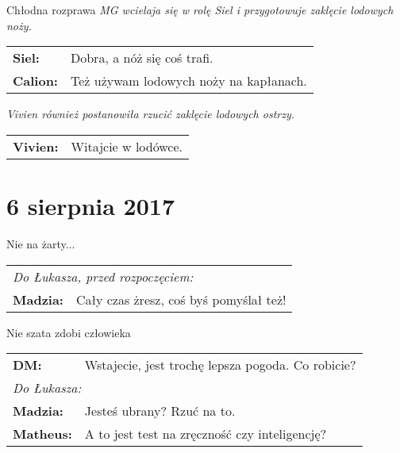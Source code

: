 \documentclass[10pt,twoside,twocolumn]{book}
\begin{document}
\begin{rpg-quotebox}{Chłodna rozprawa}
   \textit{MG wcielaja się w rolę Siel i przygotowuje zaklęcie lodowych noży.} \\

   \begin{tabularx}{\columnwidth}{lX}
      \textbf{Siel:} & Dobra, a nóż się coś trafi.\\
      \textbf{Calion:} & Też używam lodowych noży na kapłanach.\\
   \end{tabularx}
   \newline

   \textit{Vivien również postanowiła rzucić zaklęcie lodowych ostrzy.}\\

   \begin{tabularx}{\columnwidth}{lX}
      \textbf{Vivien:} & Witajcie w lodówce.\\
   \end{tabularx}
\end{rpg-quotebox}

\section*{6 sierpnia 2017}

\begin{rpg-quotebox}{Nie na żarty...}
   \begin{tabularx}{\columnwidth}{lX}
      \multicolumn{2}{l}{\textit{Do Łukasza, przed rozpoczęciem:}}\\
      \textbf{Madzia:} & Cały czas żresz, coś byś pomyślał też!\\
   \end{tabularx}
\end{rpg-quotebox}

\begin{rpg-quotebox}{Nie szata zdobi człowieka}
   \begin{tabularx}{\columnwidth}{lX}
      \textbf{DM:} & Wstajecie, jest trochę lepsza pogoda. Co robicie?\\
      \multicolumn{2}{l}{\textit{Do Łukasza:}}\\
      \textbf{Madzia:} & Jesteś ubrany? Rzuć na to.\\
      \textbf{Matheus:} & A to jest test na zręczność czy inteligencję?\\
   \end{tabularx}
\end{rpg-quotebox}
\end{document}
